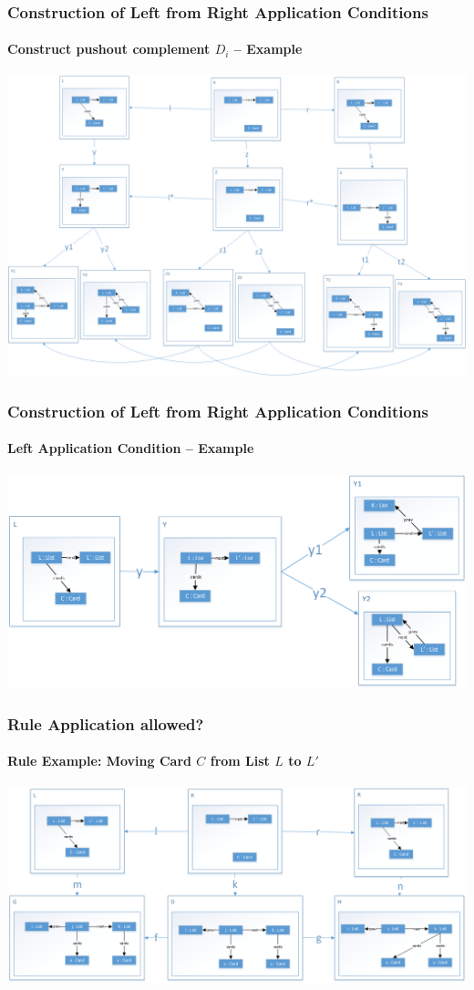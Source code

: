 \documentclass[32pt,t]{beamer}
\begin{document}
	\begin{frame}
		\frametitle{Construction of Left from Right Application Conditions}
		\framesubtitle{Construct pushout complement $D_i$ -- Example}
		\centering
		\includegraphics[height=.8\textheight]{Images/55_RightAC-To-LeftAC_Example_Step5}
	\end{frame}

	\begin{frame}
		\frametitle{Construction of Left from Right Application Conditions}
		\framesubtitle{Left Application Condition -- Example}
		\centering
		\includegraphics[width=\linewidth]{Images/60_Result-LeftAC}
	\end{frame}

	\begin{frame}
		\frametitle{Rule Application allowed?}
		\framesubtitle{Rule Example: Moving Card $C$ from List $L$ to $L'$}
		\centering
		\includegraphics[width=\linewidth]{Images/01_Rule_Example}
	\end{frame}
\end{document}
